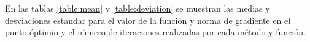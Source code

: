 En las tablas \ref{table:mean} y \ref{table:deviation} se muestran las medias y desviaciones estandar para el valor de la función y norma de gradiente en el punto óptimio y el número de iteraciones realizadas por cada método y función.



